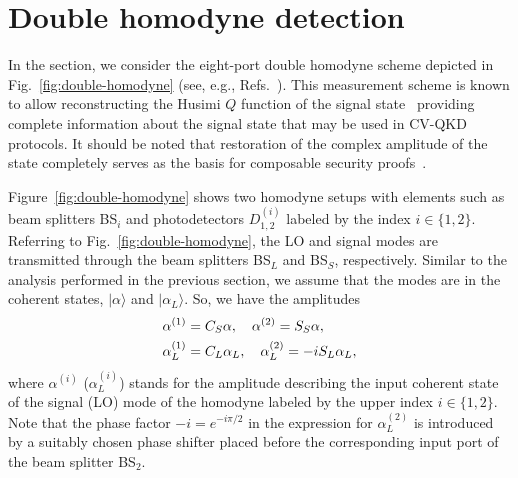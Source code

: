 \documentclass[%
reprint,
superscriptaddress,
 amsmath,amssymb,amsfonts,
 aps,
 pra,
 longbibliography
]{revtex4-2}
\newcommand{\ket}[1]{\ensuremath{|{#1}\rangle}}
\begin{document}

%
%

\section{Double homodyne detection}
\label{sec:double-homodyne}

In the section,
we consider the eight-port double homodyne scheme
depicted in Fig.~\ref{fig:double-homodyne}
(see, e.g., Refs.~\cite{Vogel:bk:2006,lahti2010realistic}).
This measurement scheme is known to allow reconstructing the
Husimi $Q$ function of the signal state~\cite{Richter:98} providing complete information about the signal
state that may be used in CV-QKD protocols. It should be noted that restoration of the
complex amplitude of the state completely serves as the basis for composable security
proofs~\cite{PhysRevLett.93.170504,PhysRevLett.118.200501}.


Figure~\ref{fig:double-homodyne} shows two homodyne setups
with elements such as beam splitters BS$_i$
and photodetectors $D_{1,2}^{(i)}$ labeled by the index $i\in\{1,2\}$.
Referring to Fig.~\ref{fig:double-homodyne},
the LO and signal modes are transmitted through
the beam splitters BS$_L$ and BS$_S$, respectively.
Similar to the analysis performed in the previous section,
we assume that the modes are in the coherent states,
$\ket{\alpha}$ and $\ket{\alpha_L}$. So, we
have the amplitudes 
\begin{align}
  &
    \label{eq:amplitudes-SL-i}
    \alpha^{(1)}=C_S\alpha,\quad \alpha^{(2)}=S_S\alpha,
    \notag
  \\
  &
    \alpha_L^{(1)}=C_L\alpha_L,\quad \alpha_L^{(2)}=-iS_L\alpha_L,
\end{align}
where $\alpha^{(i)}$ ($\alpha_{L}^{(i)}$) stands for the amplitude
describing the input coherent state of the signal (LO) mode
of the homodyne labeled by the upper index $i\in \{1,2\}$. 
Note that the phase factor $-i=e^{-i\pi/2}$ in the expression for
$\alpha^{(2)}_L$ is introduced by
a suitably chosen phase shifter placed before
the corresponding input port
of the beam splitter BS$_2$.
\end{document}

